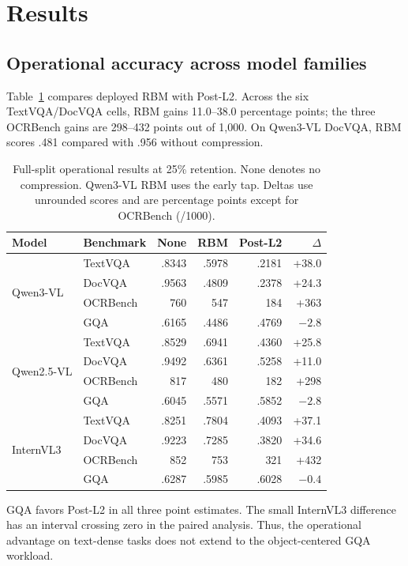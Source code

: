 \documentclass[10pt,twocolumn,letterpaper]{article}
\begin{document}
\section{Results}
\subsection{Operational accuracy across model families}
Table~\ref{tab:main} compares deployed RBM with Post-L2. Across the six TextVQA/DocVQA cells, RBM gains 11.0--38.0 percentage points; the three OCRBench gains are 298--432 points out of 1,000. On Qwen3-VL DocVQA, RBM scores .481 compared with .956 without compression.

\begin{table}[t]
\centering
\caption{\label{tab:main}Full-split operational results at 25\% retention. None denotes no compression. Qwen3-VL RBM uses the early tap. Deltas use unrounded scores and are percentage points except for OCRBench (/1000).}
\small
\setlength{\tabcolsep}{4pt}
\begin{tabular}{llrrrr}
\toprule
Model & Benchmark & None & RBM & Post-L2 & $\Delta$\\
\midrule
\multirow{4}{*}{Qwen3-VL}
& TextVQA & .8343 & .5978 & .2181 & +38.0\\
& DocVQA & .9563 & .4809 & .2378 & +24.3\\
& OCRBench & 760 & 547 & 184 & +363\\
& GQA & .6165 & .4486 & .4769 & $-2.8$\\
\midrule
\multirow{4}{*}{Qwen2.5-VL}
& TextVQA & .8529 & .6941 & .4360 & +25.8\\
& DocVQA & .9492 & .6361 & .5258 & +11.0\\
& OCRBench & 817 & 480 & 182 & +298\\
& GQA & .6045 & .5571 & .5852 & $-2.8$\\
\midrule
\multirow{4}{*}{InternVL3}
& TextVQA & .8251 & .7804 & .4093 & +37.1\\
& DocVQA & .9223 & .7285 & .3820 & +34.6\\
& OCRBench & 852 & 753 & 321 & +432\\
& GQA & .6287 & .5985 & .6028 & $-0.4$\\
\bottomrule
\end{tabular}
\end{table}

GQA favors Post-L2 in all three point estimates. The small InternVL3 difference has an interval crossing zero in the paired analysis. Thus, the operational advantage on text-dense tasks does not extend to the object-centered GQA workload.
\end{document}

